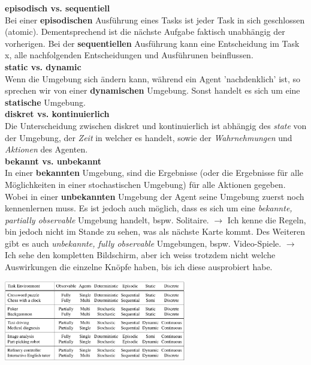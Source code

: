 \documentclass{article}
\newenvironment{Figure}
	{\par\medskip\noindent\minipage{\linewidth}}
	{\endminipage\par\medskip}
\theoremstyle{merke}
\theoremstyle{definition}
\begin{document}
\textbf{episodisch vs. sequentiell}\\
Bei einer \textbf{episodischen} Ausführung eines Tasks ist jeder Task in sich geschlossen (atomic).  Dementsprechend ist die nächste Aufgabe faktisch unabhängig der vorherigen. Bei der \textbf{sequentiellen} Ausführung kann eine Entscheidung im Task x, alle nachfolgenden Entscheidungen und Ausführunen beinflussen.\\

\textbf{static vs. dynamic}\\
Wenn die Umgebung sich ändern kann, während ein Agent 'nachdenklich' ist, so sprechen wir von einer \textbf{dynamischen} Umgebung. Sonst handelt es sich um eine \textbf{statische} Umgebung.\\

\textbf{diskret vs. kontinuierlich}\\
Die Unterscheidung zwischen diskret und kontinuierlich ist abhängig des \textit{state} von der Umgebung, der \textit{Zeit} in welcher es handelt, sowie der \textit{Wahrnehmungen} und \textit{Aktionen} des Agenten.\\

\textbf{bekannt vs. unbekannt}\\
In einer \textbf{bekannten} Umgebung, sind die Ergebnisse (oder die Ergebnisse für alle Möglichkeiten in einer stochastischen Umgebung) für alle Aktionen gegeben. Wobei in einer \textbf{unbekannten} Umgebung der Agent seine Umgebung zuerst noch kennenlernen muss. Es ist jedoch auch möglich, dass es sich um eine \textit{bekannte, partially observable} Umgebung handelt, bspw. Solitaire. $\rightarrow$ Ich kenne die Regeln, bin jedoch nicht im Stande zu sehen, was als nächste Karte kommt. Des Weiteren gibt es auch \textit{unbekannte, fully observable} Umgebungen, bspw. Video-Spiele. $\rightarrow$ Ich sehe den kompletten Bildschirm, aber ich weiss trotzdem nicht welche Auswirkungen die einzelne Knöpfe haben, bis ich diese ausprobiert habe.

\begin{Figure}
\centering
\includegraphics[width=300px]{img/TaskEnvironmentsCharacteristics.png}
	\label{fig:Beispiele von Task Environsments mit deren charakteristik}
\end{Figure}
\end{document}
